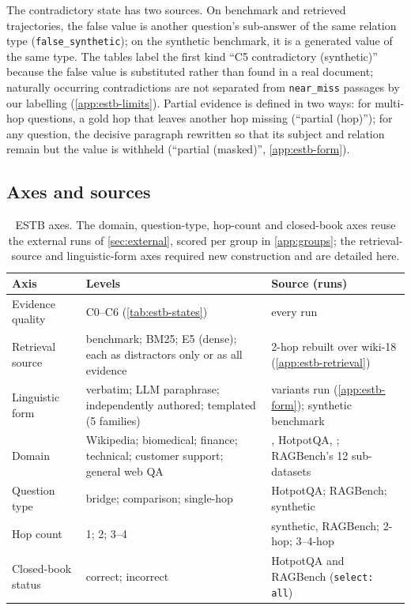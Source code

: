 The contradictory state has two sources. On benchmark and retrieved trajectories, the false value is another question's sub-answer of the same relation type (\texttt{false\_synthetic}); on the synthetic benchmark, it is a generated value of the same type. The tables label the first kind ``C5 contradictory (synthetic)'' because the false value is substituted rather than found in a real document; naturally occurring contradictions are not separated from \texttt{near\_miss} passages by our labelling (\cref{app:estb-limits}). Partial evidence is defined in two ways: for multi-hop questions, a gold hop that leaves another hop missing (``partial (hop)''); for any question, the decisive paragraph rewritten so that its subject and relation remain but the value is withheld (``partial (masked)'', \cref{app:estb-form}).

\subsection{Axes and sources}
\label{app:estb-axes}

\begin{table}[h]
\centering\scriptsize
\setlength{\tabcolsep}{3pt}
\begin{tabular}{lp{4.1cm}p{6.1cm}}
\toprule
Axis & Levels & Source (runs) \\
\midrule
Evidence quality & C0--C6 (\cref{tab:estb-states}) & every run \\
Retrieval source & benchmark; BM25; E5 (dense); each as distractors only or as all evidence & \musique{} 2-hop rebuilt over wiki-18 (\cref{app:estb-retrieval}) \\
Linguistic form & verbatim; LLM paraphrase; independently authored; templated (5 families) & \musique{} variants run (\cref{app:estb-form}); synthetic benchmark \\
Domain & Wikipedia; biomedical; finance; technical; customer support; general web QA & \musique{}, HotpotQA, \twowiki{}; RAGBench's 12 sub-datasets \\
Question type & bridge; comparison; single-hop & HotpotQA; RAGBench; synthetic \\
Hop count & 1; 2; 3--4 & synthetic, RAGBench; \musique{} 2-hop; \musique{} 3--4-hop \\
Closed-book status & correct; incorrect & HotpotQA and RAGBench (\texttt{select: all}) \\
\bottomrule
\end{tabular}
\caption{ESTB axes. The domain, question-type, hop-count and closed-book axes reuse the external runs of \cref{sec:external}, scored per group in \cref{app:groups}; the retrieval-source and linguistic-form axes required new construction and are detailed here.}
\label{tab:estb-axes}
\end{table}

